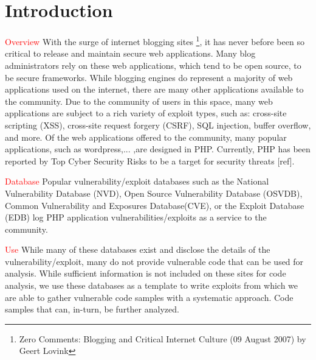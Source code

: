 \documentclass[letterpaper,twocolumn,10pt]{article}
\begin{document}
\section{Introduction}

\textcolor{red}{Overview}
With the surge of internet blogging sites \footnote{Zero Comments: Blogging and Critical Internet Culture (09 August 2007) by Geert Lovink}, it has never before been so critical to release and maintain secure web applications.   Many blog administrators rely on these web applications, which tend to be open source, to be secure frameworks.  While blogging engines do represent a majority of web applications used on the internet, there are many other applications available to the community.  Due to the community of users in this space, many web applications are subject to a rich variety of exploit types, such as: cross-site scripting (XSS), cross-site request forgery (CSRF), SQL injection, buffer overflow, and more.  Of the web applications offered to the community, many popular applications, such as wordpress,... ,are designed in PHP.  Currently, PHP has been reported by Top Cyber Security Risks to be a target for security threats [ref].\par

\textcolor{red}{Database}
Popular vulnerability/exploit databases such as the National Vulnerability Database (NVD), Open Source Vulnerability Database (OSVDB), Common Vulnerability and Exposures Database(CVE), or the Exploit Database (EDB) log PHP application vulnerabilities/exploits as a service to the community.   \par

\textcolor{red}{Use}
While many of these databases exist and disclose the details of the vulnerability/exploit, many do not provide vulnerable code that can be used for analysis.  While sufficient information is not included on these sites for code analysis, we use these databases as a template to write exploits from which we are able to gather vulnerable code samples with a systematic approach.  Code samples that can, in-turn, be further analyzed.
\par
\end{document}
